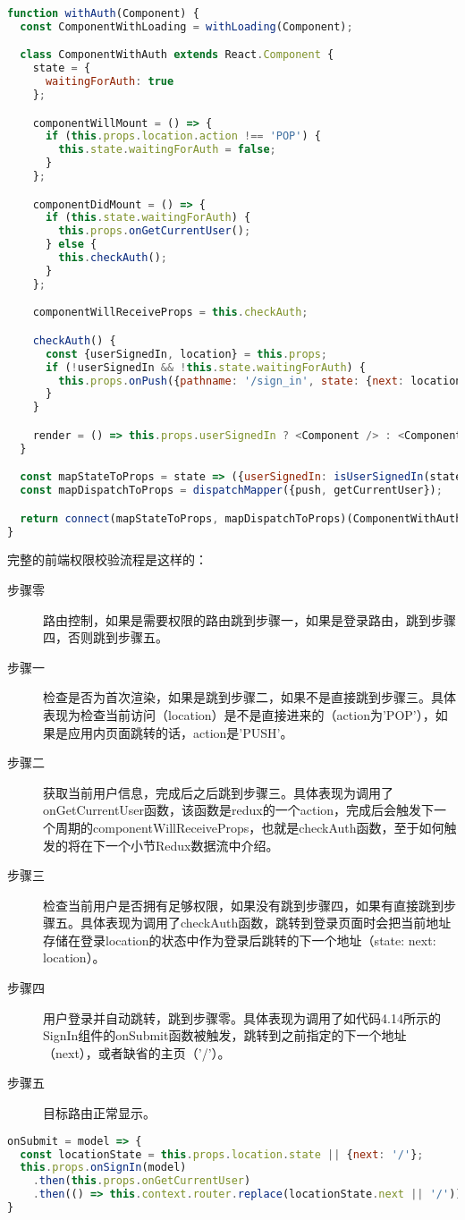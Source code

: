 \begin{lstlisting}[language={JavaScript}, caption={withAuth高阶组件函数}]
function withAuth(Component) {
  const ComponentWithLoading = withLoading(Component);

  class ComponentWithAuth extends React.Component {
    state = {
      waitingForAuth: true
    };

    componentWillMount = () => {
      if (this.props.location.action !== 'POP') {
        this.state.waitingForAuth = false;
      }
    };

    componentDidMount = () => {
      if (this.state.waitingForAuth) {
        this.props.onGetCurrentUser();
      } else {
        this.checkAuth();
      }
    };

    componentWillReceiveProps = this.checkAuth;

    checkAuth() {
      const {userSignedIn, location} = this.props;
      if (!userSignedIn && !this.state.waitingForAuth) {
        this.props.onPush({pathname: '/sign_in', state: {next: location}});
      }
    }

    render = () => this.props.userSignedIn ? <Component /> : <ComponentWithLoading />;
  }

  const mapStateToProps = state => ({userSignedIn: isUserSignedIn(state)});
  const mapDispatchToProps = dispatchMapper({push, getCurrentUser});

  return connect(mapStateToProps, mapDispatchToProps)(ComponentWithAuth);
}
\end{lstlisting}

完整的前端权限校验流程是这样的：
\begin{description}
  \item[步骤零] 路由控制，如果是需要权限的路由跳到步骤一，如果是登录路由，跳到步骤四，否则跳到步骤五。
  \item[步骤一] 检查是否为首次渲染，如果是跳到步骤二，如果不是直接跳到步骤三。具体表现为检查当前访问（location）是不是直接进来的（action为'POP'），如果是应用内页面跳转的话，action是'PUSH'。
  \item[步骤二] 获取当前用户信息，完成后之后跳到步骤三。具体表现为调用了onGetCurrentUser函数，该函数是redux的一个action，完成后会触发下一个周期的componentWillReceiveProps，也就是checkAuth函数，至于如何触发的将在下一个小节Redux数据流中介绍。
  \item[步骤三] 检查当前用户是否拥有足够权限，如果没有跳到步骤四，如果有直接跳到步骤五。具体表现为调用了checkAuth函数，跳转到登录页面时会把当前地址存储在登录location的状态中作为登录后跳转的下一个地址（state: {next: location}）。
  \item[步骤四] 用户登录并自动跳转，跳到步骤零。具体表现为调用了如代码4.14所示的SignIn组件的onSubmit函数被触发，跳转到之前指定的下一个地址（next），或者缺省的主页（'/'）。
  \item[步骤五] 目标路由正常显示。
\end{description}
\begin{lstlisting}[language={JavaScript}, caption={SignIn组件中的onSubmit函数}]
onSubmit = model => {
  const locationState = this.props.location.state || {next: '/'};
  this.props.onSignIn(model)
    .then(this.props.onGetCurrentUser)
    .then(() => this.context.router.replace(locationState.next || '/'))
}
\end{lstlisting}
